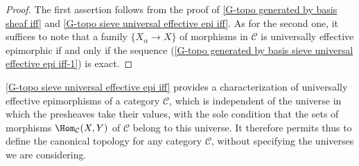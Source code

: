 \begin{proof}
The first assertion follows from the proof of \cref{G-topo generated by basis sheaf iff} and \cref{G-topo sieve universal effective epi iff}. As for the second one, it suffices to note that a family $\{X_\alpha\to X\}$ of morphisms in $\mathcal{C}$ is universally effective epimorphic if and only if the sequence (\ref{G-topo generated by basis sieve universal effective epi iff-1}) is exact.
\end{proof}
\begin{remark}
\cref{G-topo sieve universal effective epi iff} provides a characterization of universally effective epimorphisms of a category $\mathcal{C}$, which is independent of the universe in which the presheaves take their values, with the sole condition that the sets of morphisms $\Hom_{\mathcal{C}}(X,Y)$ of $\mathcal{C}$ belong to this universe. It therefore permits thus to define the canonical topology for any category $\mathcal{C}$, without specifying the universes we are considering.
\end{remark}
